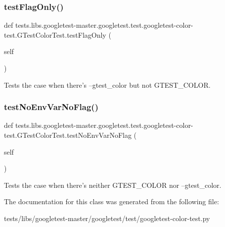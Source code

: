 \subsubsection{\texorpdfstring{test\+Flag\+Only()}{testFlagOnly()}}
{\footnotesize\ttfamily def tests.\+libs.\+googletest-\/master.\+googletest.\+test.\+googletest-\/color-\/test.\+G\+Test\+Color\+Test.\+test\+Flag\+Only (\begin{DoxyParamCaption}\item[{}]{self }\end{DoxyParamCaption})}

\begin{DoxyVerb}Tests the case when there's --gtest_color but not GTEST_COLOR.\end{DoxyVerb}
 \mbox{\label{classtests_1_1libs_1_1googletest-master_1_1googletest_1_1test_1_1googletest-color-test_1_1GTestColorTest_a61cf5133d1c90c8e3c3fb766933250fa}} 
\subsubsection{\texorpdfstring{test\+No\+Env\+Var\+No\+Flag()}{testNoEnvVarNoFlag()}}
{\footnotesize\ttfamily def tests.\+libs.\+googletest-\/master.\+googletest.\+test.\+googletest-\/color-\/test.\+G\+Test\+Color\+Test.\+test\+No\+Env\+Var\+No\+Flag (\begin{DoxyParamCaption}\item[{}]{self }\end{DoxyParamCaption})}

\begin{DoxyVerb}Tests the case when there's neither GTEST_COLOR nor --gtest_color.\end{DoxyVerb}
 

The documentation for this class was generated from the following file\+:\begin{DoxyCompactItemize}
\item 
tests/libs/googletest-\/master/googletest/test/googletest-\/color-\/test.\+py\end{DoxyCompactItemize}
